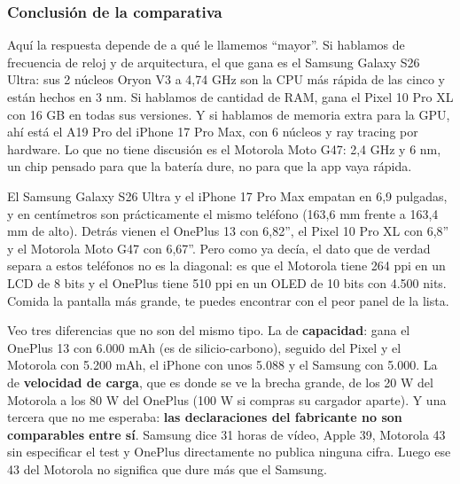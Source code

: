\subsubsection*{Conclusión de la comparativa}


Aquí la respuesta depende de a qué le llamemos \enquote{mayor}. Si hablamos de frecuencia de reloj y de arquitectura, el que gana es el Samsung Galaxy S26 Ultra: sus 2 núcleos Oryon V3 a 4,74 GHz son la CPU más rápida de las cinco y están hechos en 3 nm. Si hablamos de cantidad de RAM, gana el Pixel 10 Pro XL con 16 GB en todas sus versiones. Y si hablamos de memoria extra para la GPU, ahí está el A19 Pro del iPhone 17 Pro Max, con 6 núcleos y ray tracing por hardware. Lo que no tiene discusión es el Motorola Moto G47: 2,4 GHz y 6 nm, un chip pensado para que la batería dure, no para que la app vaya rápida.


El Samsung Galaxy S26 Ultra y el iPhone 17 Pro Max empatan en 6,9 pulgadas, y en centímetros son prácticamente el mismo teléfono (163,6 mm frente a 163,4 mm de alto). Detrás vienen el OnePlus 13 con 6,82'', el Pixel 10 Pro XL con 6,8'' y el Motorola Moto G47 con 6,67''. Pero como ya decía, el dato que de verdad separa a estos teléfonos no es la diagonal: es que el Motorola tiene 264 ppi en un LCD de 8 bits y el OnePlus tiene 510 ppi en un OLED de 10 bits con 4.500 nits. Comida la pantalla más grande, te puedes encontrar con el peor panel de la lista.


Veo tres diferencias que no son del mismo tipo. La de \textbf{capacidad}: gana el OnePlus 13 con 6.000 mAh (es de silicio-carbono), seguido del Pixel y el Motorola con 5.200 mAh, el iPhone con unos 5.088 y el Samsung con 5.000. La de \textbf{velocidad de carga}, que es donde se ve la brecha grande, de los 20 W del Motorola a los 80 W del OnePlus (100 W si compras su cargador aparte). Y una tercera que no me esperaba: \textbf{las declaraciones del fabricante no son comparables entre sí}. Samsung dice 31 horas de vídeo, Apple 39, Motorola 43 sin especificar el test y OnePlus directamente no publica ninguna cifra. Luego ese 43 del Motorola no significa que dure más que el Samsung.


